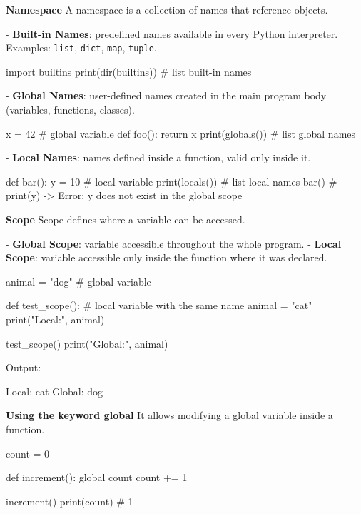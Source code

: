 \textbf{Namespace}  
A namespace is a collection of names that reference objects.

- \textbf{Built-in Names}: predefined names available in every Python interpreter.  
Examples: \texttt{list}, \texttt{dict}, \texttt{map}, \texttt{tuple}.
\begin{pythoncode}
import builtins
print(dir(builtins))   # list built-in names
\end{pythoncode}

- \textbf{Global Names}: user-defined names created in the main program body (variables, functions, classes).
\begin{pythoncode}
x = 42   # global variable
def foo():
    return x
print(globals())   # list global names
\end{pythoncode}

- \textbf{Local Names}: names defined inside a function, valid only inside it.
\begin{pythoncode}
def bar():
    y = 10  # local variable
    print(locals())   # list local names
bar()
# print(y)  -> Error: y does not exist in the global scope
\end{pythoncode}

\textbf{Scope}  
Scope defines where a variable can be accessed.

- \textbf{Global Scope}: variable accessible throughout the whole program.  
- \textbf{Local Scope}: variable accessible only inside the function where it was declared.

\begin{pythoncode}
animal = "dog"  # global variable

def test_scope():
    # local variable with the same name
    animal = "cat"
    print("Local:", animal)

test_scope()
print("Global:", animal)
\end{pythoncode}

Output:
\begin{pythoncode}
Local: cat
Global: dog
\end{pythoncode}

\textbf{Using the keyword global}  
It allows modifying a global variable inside a function.

\begin{pythoncode}
count = 0

def increment():
    global count
    count += 1

increment()
print(count)  # 1
\end{pythoncode}

